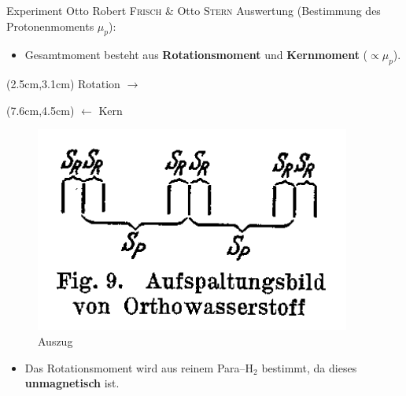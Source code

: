 \documentclass[t,9pt]{beamer}
\begin{document}
        \begin{frame}{Experiment Otto Robert \textsc{Frisch} \& Otto \textsc{Stern}}
                Auswertung (Bestimmung des Protonenmoments $\mu _p$):        
                \begin{itemize}
                        \item Gesamtmoment besteht aus \textbf{Rotationsmoment} und \textbf{Kernmoment} ($\propto \mu _p$).
                \end{itemize}
                \begin{textblock*}{100pt}(2.5cm,3.1cm)
                        Rotation $\rightarrow $ 
                \end{textblock*}
                \begin{textblock*}{100pt}(7.6cm,4.5cm)
                        $\leftarrow $ Kern
                \end{textblock*}
                \begin{figure}
                        \centering
                        \includegraphics[width=.4\textwidth]{prosi_aufspaltungsbild_orthowasserstoff.png}
                        \caption*{Auszug \cite{FrischStern1933}}
                \end{figure}
                \begin{itemize}
                        \item Das Rotationsmoment wird aus reinem Para--$\text{H}_2$ bestimmt, da dieses \textbf{unmagnetisch} ist. 
                \end{itemize}
        \end{frame}
\end{document}
